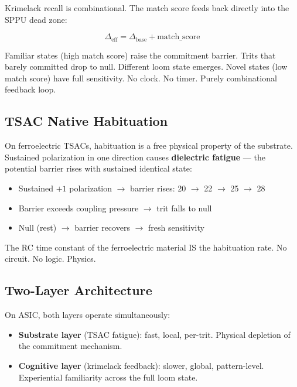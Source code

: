 \documentclass[11pt, a4paper]{article}
\begin{document}
Krimelack recall is combinational. The match score feeds back directly
into the SPPU dead zone:

\begin{equation}
  \Delta_{\text{eff}} = \Delta_{\text{base}} + \text{match\_score}
\end{equation}

Familiar states (high match score) raise the commitment barrier. Trits
that barely committed drop to null. Different loom state emerges.
Novel states (low match score) have full sensitivity. No clock. No timer.
Purely combinational feedback loop.

\subsection{TSAC Native Habituation}

On ferroelectric TSACs, habituation is a free physical property of the
substrate. Sustained polarization in one direction causes
\textbf{dielectric fatigue} --- the potential barrier rises with
sustained identical state:

\begin{itemize}[nosep]
  \item Sustained $+1$ polarization $\rightarrow$ barrier rises:
        20 $\rightarrow$ 22 $\rightarrow$ 25 $\rightarrow$ 28
  \item Barrier exceeds coupling pressure $\rightarrow$ trit falls to null
  \item Null (rest) $\rightarrow$ barrier recovers $\rightarrow$ fresh
        sensitivity
\end{itemize}

The RC time constant of the ferroelectric material IS the habituation
rate. No circuit. No logic. Physics.

\subsection{Two-Layer Architecture}

On ASIC, both layers operate simultaneously:
\begin{itemize}[nosep]
  \item \textbf{Substrate layer} (TSAC fatigue): fast, local, per-trit.
        Physical depletion of the commitment mechanism.
  \item \textbf{Cognitive layer} (krimelack feedback): slower, global,
        pattern-level. Experiential familiarity across the full loom state.
\end{itemize}
\end{document}
